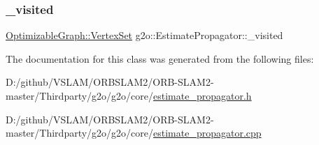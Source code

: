 \mbox{\label{classg2o_1_1_estimate_propagator_a1256927d6d1832ee300daa53d1c845a2}} 
\subsubsection{\texorpdfstring{\+\_\+visited}{\_visited}}
{\footnotesize\ttfamily \mbox{\hyperlink{classg2o_1_1_hyper_graph_a703938cdb4bb636860eed55a2489d70c}{Optimizable\+Graph\+::\+Vertex\+Set}} g2o\+::\+Estimate\+Propagator\+::\+\_\+visited\hspace{0.3cm}{\ttfamily [protected]}}



The documentation for this class was generated from the following files\+:\begin{DoxyCompactItemize}
\item 
D\+:/github/\+V\+S\+L\+A\+M/\+O\+R\+B\+S\+L\+A\+M2/\+O\+R\+B-\/\+S\+L\+A\+M2-\/master/\+Thirdparty/g2o/g2o/core/\mbox{\hyperlink{estimate__propagator_8h}{estimate\+\_\+propagator.\+h}}\item 
D\+:/github/\+V\+S\+L\+A\+M/\+O\+R\+B\+S\+L\+A\+M2/\+O\+R\+B-\/\+S\+L\+A\+M2-\/master/\+Thirdparty/g2o/g2o/core/\mbox{\hyperlink{estimate__propagator_8cpp}{estimate\+\_\+propagator.\+cpp}}\end{DoxyCompactItemize}
